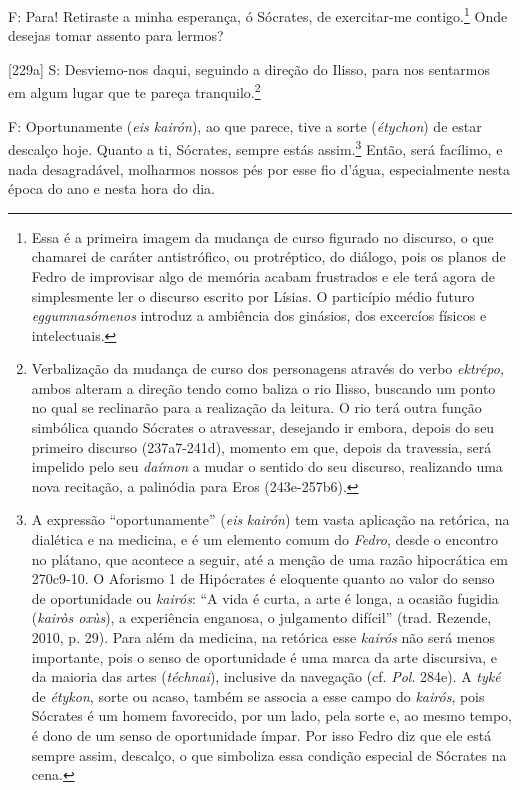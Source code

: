 F: Para! Retiraste a minha esperança, ó Sócrates, de exercitar-me
contigo.\footnote{Essa é a primeira imagem da mudança de curso figurado
  no discurso, o que chamarei de caráter antistrófico, ou protréptico,
  do diálogo, pois os planos de Fedro de improvisar algo de memória
  acabam frustrados e ele terá agora de simplesmente ler o discurso
  escrito por Lísias. O particípio médio futuro \emph{eggumnasómenos}
  introduz a ambiência dos ginásios, dos excercíos físicos e
  intelectuais.} Onde desejas tomar assento para lermos?

{[}229a{]} S: Desviemo-nos daqui, seguindo a direção do Ilisso, para nos
sentarmos em algum lugar que te pareça tranquilo.\footnote{Verbalização
  da mudança de curso dos personagens através do verbo \emph{ektrépo,}
  ambos alteram a direção tendo como baliza o rio Ilisso, buscando um
  ponto no qual se reclinarão para a realização da leitura. O rio terá
  outra função simbólica quando Sócrates o atravessar, desejando ir
  embora, depois do seu primeiro discurso (237a7-241d), momento em que,
  depois da travessia, será impelido pelo seu \emph{daímon} a mudar o
  sentido do seu discurso, realizando uma nova recitação, a palinódia
  para Eros (243e-257b6).}

F: Oportunamente (\emph{eis kairón}), ao que parece, tive a sorte
(\emph{étychon}) de estar descalço hoje. Quanto a ti, Sócrates, sempre
estás assim.\footnote{A expressão ``oportunamente'' (\emph{eis}
  \emph{kairón}) tem vasta aplicação na retórica, na dialética e na
  medicina, e é um elemento comum do \emph{Fedro}, desde o encontro no
  plátano, que acontece a seguir, até a menção de uma razão hipocrática
  em 270c9-10. O Aforismo 1 de Hipócrates é eloquente quanto ao valor do
  senso de oportunidade ou \emph{kairós}: ``A vida é curta, a arte é
  longa, a ocasião fugidia (\emph{kairòs oxùs}), a experiência enganosa,
  o julgamento difícil'' (trad. Rezende, 2010, p. 29). Para além da
  medicina, na retórica esse \emph{kairós} não será menos importante,
  pois o senso de oportunidade é uma marca da arte discursiva, e da
  maioria das artes (\emph{téchnai}), inclusive da navegação (cf.
  \emph{Pol}. 284e). A \emph{tyké} de \emph{étykon}, sorte ou acaso,
  também se associa a esse campo do \emph{kairós}, pois Sócrates é um
  homem favorecido, por um lado, pela sorte e, ao mesmo tempo, é dono de
  um senso de oportunidade ímpar. Por isso Fedro diz que ele está sempre
  assim, descalço, o que simboliza essa condição especial de Sócrates na
  cena.} Então, será facílimo, e nada desagradável, molharmos nossos pés
por esse fio d'água, especialmente nesta época do ano e nesta hora do
dia.

